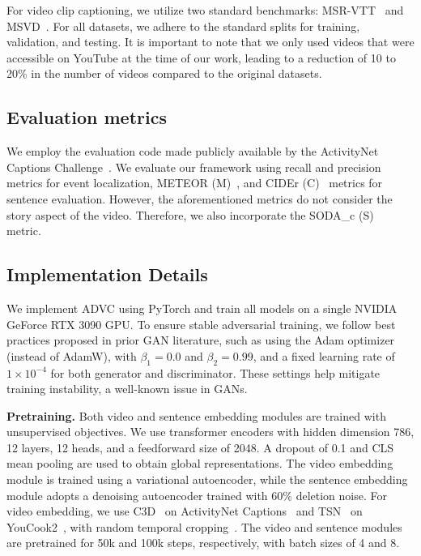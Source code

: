 For video clip captioning, we utilize two standard benchmarks: MSR-VTT~\cite{Xu2016-ti} and MSVD~\cite{Chen2011-ai}.
For all datasets, we adhere to the standard splits for training, validation, and testing.
It is important to note that we only used videos that were accessible on YouTube at the time of our work, leading to a reduction of 10 to 20\% in the number of videos compared to the original datasets.
 
\subsection{Evaluation metrics}
We employ the evaluation code made publicly available by the ActivityNet Captions Challenge~\cite{Krishna2017-pw}.
We evaluate our framework using recall and precision metrics for event localization, METEOR (M)~\cite{Banerjee2005-zo}, and CIDEr (C)~\cite{Vedantam2015-ma} metrics for sentence evaluation.
However, the aforementioned metrics do not consider the story aspect of the video.
Therefore, we also incorporate the SODA\_c (S)~\cite{Fujita2020-ob} metric.

\subsection{Implementation Details}
We implement ADVC using PyTorch and train all models on a single NVIDIA GeForce RTX 3090 GPU. To ensure stable adversarial training, we follow best practices proposed in prior GAN literature, such as using the Adam optimizer (instead of AdamW), with $\beta_1 = 0.0$ and $\beta_2 = 0.99$, and a fixed learning rate of $1 \times 10^{-4}$ for both generator and discriminator.
These settings help mitigate training instability, a well-known issue in GANs.

\textbf{Pretraining.}
Both video and sentence embedding modules are trained with unsupervised objectives.
We use transformer encoders with hidden dimension 786, 12 layers, 12 heads, and a feedforward size of 2048.
A dropout of 0.1 and CLS mean pooling are used to obtain global representations. 
The video embedding module is trained using a variational autoencoder, while the sentence embedding module adopts a denoising autoencoder trained with 60\% deletion noise.
For video embedding, we use C3D~\cite{Tran2015-uq} on ActivityNet Captions~\cite{Krishna2017-pw} and TSN~\cite{Wang2019-xv} on YouCook2~\cite{Zhou2018-eq}, with random temporal cropping~\cite{Qian2021-mm}. 
The video and sentence modules are pretrained for 50k and 100k steps, respectively, with batch sizes of 4 and 8.

